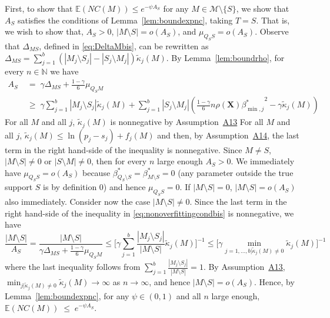 \documentclass[bj,authoryear]{imsart}
\theoremstyle{plain}
\newcommand{\E}{\mathbb{E}}
\newcommand{\N}{\mathbb{N}}
\newcommand{\bs}{\boldsymbol}
\begin{document}
First, to show that $\E(NC(M)) \leq e^{-\psi A_S}$
for any $M\in\mathcal{M}\setminus \{S\}$, we show that $A_S$ satisfies the conditions of Lemma~\ref{lem:boundexpnc}, taking $T=S$. 
That is, we wish to show that, $A_S>0$, $|M\setminus S|=o(A_S)$, and $\mu_{Q_S S}=o(A_S)$. 
Observe that $\Delta_{MS}$, defined in \eqref{eq:DeltaMbis}, can be rewritten as $\Delta_{MS}=\sum_{j=1}^b(|M_j\setminus S_j|-|S_j\setminus M_j|)\tilde{\kappa}_j(M)$. By  Lemma~\ref{lem:boundrho}, for every $n\in \N$ we have 
\begin{equation}\label{eq:nonoverfittingcondbis}
\begin{aligned}
   A_S\;&=\; \gamma \Delta_{MS}+\frac{1-\gamma}{6}\mu_{Q_SM}\\
   &\geq\; \gamma\sum_{j=1}^b|M_j \setminus S_j|\tilde{\kappa}_j(M) + \sum_{j=1}^b |S_j\setminus M_j |\left(\tfrac{1-\gamma}{6} n \rho(\bs X) {\beta^*_{\min,j}}^{2} - \gamma\tilde{\kappa}_j(M)\right) 
\end{aligned}
\end{equation} 
For all $M$ and all $j$, $\tilde{\kappa}_j(M)$ is nonnegative by Assumption~\hyperlink{lab:A13}{A13}
For all $M$ and all $j$, $\tilde{\kappa}_j(M)\leq \ln(p_j-s_j)+f_j(M)$ and then, by Assumption~\hyperlink{lab:A14}{A14}, the last term in the right hand-side of the inequality is nonnegative. Since $M\neq S$, $|M\setminus S|\neq0$ or $|S\setminus M|\neq0$, then for every $n$ large enough $A_S>0$. We immediately have $\mu_{Q_S S}=o(A_S)$ because $\beta^*_{Q_S\setminus S}=\beta^*_{M\setminus S}=0$ (any parameter outside the true support $S$ is by definition 0) and hence $\mu_{Q_S S}=0$.
If $|M\setminus S|=0$, $|M\setminus S|=o(A_S)$ also immediately. Consider now the case $|M\setminus S|\neq 0$. Since the last term in the right hand-side of the inequality in \eqref{eq:nonoverfittingcondbis} is nonnegative, we have
$$\frac{|M\setminus S|}{A_S}
= \frac{|M\setminus S|}{\gamma \Delta_{MS}+\frac{1-\gamma}{6}\mu_{Q_SM}}
\leq \bigg[ \gamma\sum_{j=1}^b\frac{|M_j \setminus S_j|}{|M\setminus S|}\tilde{\kappa}_j(M) \bigg]^{-1} \leq \Big[ \gamma\min_{j=1,\ldots,b|\tilde{\kappa}_j(M) \neq0}\tilde{\kappa}_j(M) \Big]^{-1} $$
where the last inequality follows from $\sum_{j=1}^b\frac{|M_j \setminus S_j|}{|M\setminus S|}=1$. By Assumption~\hyperlink{lab:A13}{A13}, $\min_{j|\tilde{\kappa}_j(M) \neq0} \tilde{\kappa}_j(M) \to \infty$ as $n \rightarrow \infty$, and hence $|M\setminus S|=o(A_S)$. Hence, %
by Lemma~\ref{lem:boundexpnc}, for any $\psi\in(0,1)$ and all $n$ large enough,
$
\E(NC(M))\;\leq\;e^{-\psi A_S}.
$
\end{document}
